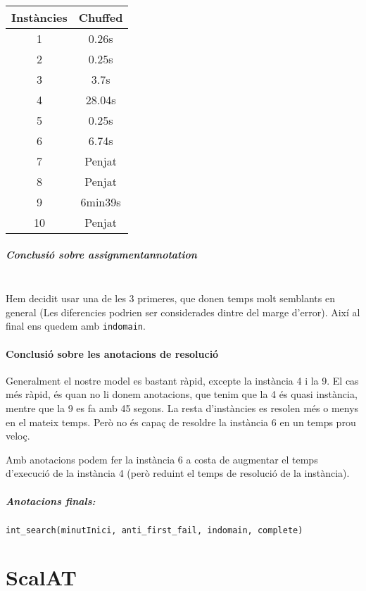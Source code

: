 \documentclass[11pt,a4paper,twoside]{report}
\begin{document}
\begin{tabular}{|c|c|}
    \hline
    Instàncies & Chuffed \\
    \hline
    1 & 0.26s  \\
    2 & 0.25s  \\
    3 & 3.7s   \\
    4 & 28.04s  \\
    5 & 0.25s   \\
    6 & 6.74s   \\
    7 & Penjat   \\
    8 & Penjat   \\
    9 & 6min39s  \\
    10 & Penjat   \\
    \hline
\end{tabular}


\paragraph*{Conclusió sobre assignmentannotation} ~\\

Hem decidit usar una de les 3 primeres, que donen temps molt semblants en general (Les diferencies podrien ser considerades dintre del marge d'error).
Així al final ens quedem amb \texttt{indomain}.


\subsubsection{Conclusió sobre les anotacions de resolució}

Generalment el nostre model es bastant ràpid, excepte la instància 4 i la 9. El cas més ràpid, és quan no li donem anotacions, que tenim que la 4 és quasi instància, mentre que la 9 es fa amb 45 segons. La resta d'instàncies es resolen més o menys en el mateix temps.
Però no és capaç de resoldre la instància 6 en un temps prou veloç.

Amb anotacions podem fer la instància 6 a costa de augmentar el temps d'execució de la instància 4 (però reduint el temps de resolució de la instància).


\paragraph*{Anotacions finals:} \texttt{int\_search(minutInici, anti\_first\_fail, indomain, complete)}

\chapter{ScalAT}
\end{document}
